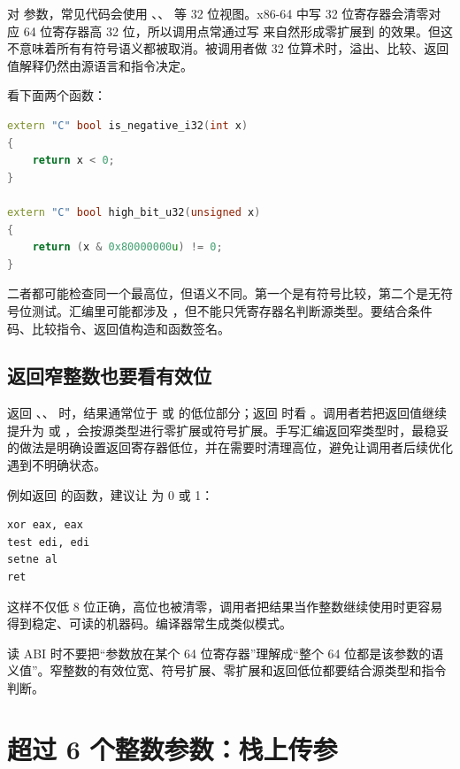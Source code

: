 对  参数，常见代码会使用 、、 等 32 位视图。x86-64 中写 32 位寄存器会清零对应 64 位寄存器高 32 位，所以调用点常通过写  来自然形成零扩展到  的效果。但这不意味着所有有符号语义都被取消。被调用者做 32 位算术时，溢出、比较、返回值解释仍然由源语言和指令决定。

看下面两个函数：

\begin{lstlisting}[language=C++]
extern "C" bool is_negative_i32(int x)
{
    return x < 0;
}

extern "C" bool high_bit_u32(unsigned x)
{
    return (x & 0x80000000u) != 0;
}
\end{lstlisting}

二者都可能检查同一个最高位，但语义不同。第一个是有符号比较，第二个是无符号位测试。汇编里可能都涉及 ，但不能只凭寄存器名判断源类型。要结合条件码、比较指令、返回值构造和函数签名。

\subsection{返回窄整数也要看有效位}

返回 、、 时，结果通常位于  或  的低位部分；返回  时看 。调用者若把返回值继续提升为  或 ，会按源类型进行零扩展或符号扩展。手写汇编返回窄类型时，最稳妥的做法是明确设置返回寄存器低位，并在需要时清理高位，避免让调用者后续优化遇到不明确状态。

例如返回  的函数，建议让  为 0 或 1：

\begin{lstlisting}
xor eax, eax
test edi, edi
setne al
ret
\end{lstlisting}

这样不仅低 8 位正确，高位也被清零，调用者把结果当作整数继续使用时更容易得到稳定、可读的机器码。编译器常生成类似模式。

\begin{warningbox}
读 ABI 时不要把“参数放在某个 64 位寄存器”理解成“整个 64 位都是该参数的语义值”。窄整数的有效位宽、符号扩展、零扩展和返回低位都要结合源类型和指令判断。
\end{warningbox}

\section{超过 6 个整数参数：栈上传参}

